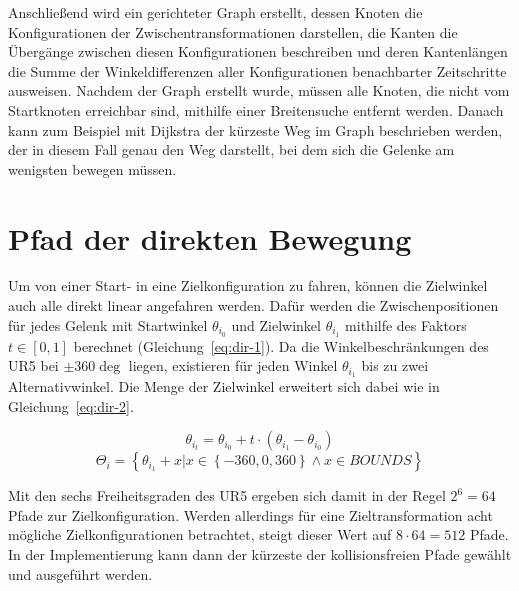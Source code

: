 Anschließend wird ein gerichteter Graph erstellt, dessen Knoten die Konfigurationen der Zwischentransformationen darstellen, die Kanten die Übergänge zwischen diesen Konfigurationen beschreiben und deren Kantenlängen die Summe der Winkeldifferenzen aller Konfigurationen benachbarter Zeitschritte ausweisen.
Nachdem der Graph erstellt wurde, müssen alle Knoten, die nicht vom Startknoten erreichbar sind, mithilfe einer Breitensuche entfernt werden.
Danach kann zum Beispiel mit Dijkstra der kürzeste Weg im Graph beschrieben werden, der in diesem Fall genau den Weg darstellt, bei dem sich die Gelenke am wenigsten bewegen müssen.


\section{Pfad der direkten Bewegung}\label{sec:direkterweg}

Um von einer Start- in eine Zielkonfiguration zu fahren, können die Zielwinkel auch alle direkt linear angefahren werden.
Dafür werden die Zwischenpositionen für jedes Gelenk mit Startwinkel $\theta_{i_0}$ und Zielwinkel $\theta_{i_1}$ mithilfe des Faktors $t \in \left[0,1\right]$ berechnet (Gleichung~\ref{eq:dir-1}).
Da die Winkelbeschränkungen des UR5 bei $\pm 360\deg$ liegen, existieren für jeden Winkel $\theta_{i_1}$ bis zu zwei Alternativwinkel.
Die Menge der Zielwinkel erweitert sich dabei wie in Gleichung~\ref{eq:dir-2}.

\begin{equation}
    \theta_{i_t} = \theta_{i_0} + t \cdot \left(  \theta_{i_1} -  \theta_{i_0} \right)  \label{eq:dir-1}
\end{equation}
\begin{equation}
    \Theta_i = \left\{ \theta_{i_1} + x \lvert x \in \left\{ -360, 0, 360 \right\} \wedge x \in BOUNDS  \right\}
    \label{eq:dir-2}
\end{equation}



Mit den sechs Freiheitsgraden des UR5 ergeben sich damit in der Regel $2^{6}=64$ Pfade zur Zielkonfiguration.
Werden allerdings für eine Zieltransformation acht mögliche Zielkonfigurationen betrachtet, steigt dieser Wert auf $8\cdot 64=512$ Pfade.
In der Implementierung kann dann der kürzeste der kollisionsfreien Pfade gewählt und ausgeführt werden.

